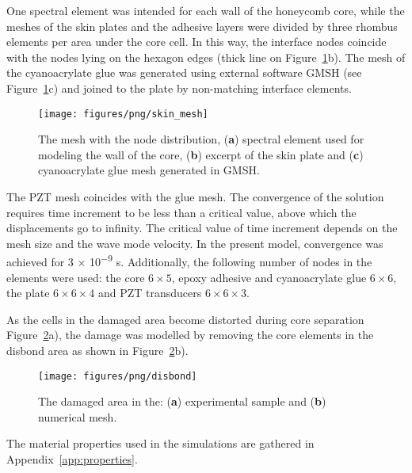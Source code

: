 \documentclass[sensors,article,accept,moreauthors,pdftex]{Definitions/mdpi}
\begin{document}
\begin{paracol}{2}
One spectral element was intended for each wall of the honeycomb core, while the meshes of the skin plates and the adhesive layers were divided by three rhombus elements per area under the core cell.
In this way, the interface nodes coincide with the nodes lying on the hexagon edges (thick line on Figure~\ref{fig:skin_mesh}b).
The mesh of the cyanoacrylate glue was generated using external software GMSH \cite{geuzaine2009gmsh} (see Figure~\ref{fig:skin_mesh}c) and joined to the plate by non-matching interface elements.

\vspace{-6pt}
\begin{figure}[H]
		\texttt{[image: figures/png/skin\_mesh]}
	\caption{The mesh with the node distribution, (\textbf{a}) spectral element used for modeling the wall of the core, (\textbf{b}) excerpt of the skin plate and (\textbf{c}) cyanoacrylate glue mesh generated in GMSH.}
	\label{fig:skin_mesh}
\end{figure}


 The PZT mesh coincides with the glue mesh.
The convergence of the solution requires time increment to be less than a critical value, above which the displacements go to infinity.
The critical value of time increment depends on the mesh size and the wave mode velocity.
In the present model, convergence was achieved for 3 $\times$ 10\textsuperscript{$-$9} s.
Additionally, the following number of nodes in the elements were used: the core \(6 \times 5\), epoxy adhesive and cyanoacrylate glue \(6 \times 6\), the plate \(6 \times 6 \times 4\) and PZT transducers \(6 \times 6 \times 3\).

As the cells in the damaged area become distorted during core separation Figure~\ref{fig:disbond}a), the damage was modelled by removing the core elements in the disbond area as  shown in Figure~\ref{fig:disbond}b).
\begin{figure}[H]
		\texttt{[image: figures/png/disbond]}
	\caption{The damaged area in the: (\textbf{a}) experimental sample and (\textbf{b}) numerical mesh.}
	\label{fig:disbond}
\end{figure}

The material properties used in the simulations are gathered in Appendix~\ref{app:properties}.

\end{paracol}
\end{document}
